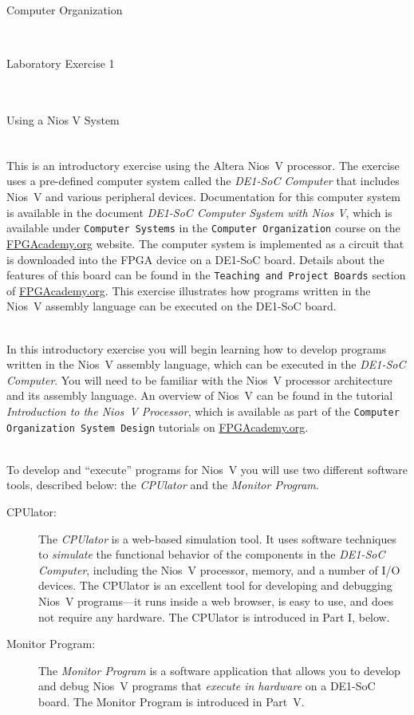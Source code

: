 \documentclass[epsfig,10pt,fullpage]{article}
\newcommand{\LabNum}{1}
\begin{document}
\centerline{\huge Computer Organization}
~\\
\centerline{\huge Laboratory Exercise \LabNum}
~\\
\centerline{\large Using a Nios\textsuperscript{\textregistered} V System}
~\\

\noindent
This is an introductory exercise using the Altera\textsuperscript{\textregistered} 
Nios\textsuperscript{\textregistered}~V processor.  The exercise uses 
a pre-defined computer system called the {\it DE1-SoC Computer} that includes Nios~V 
and various peripheral devices. Documentation for this computer system is available in the
document {\it DE1-SoC Computer System with Nios V}, which is available under 
\texttt{Computer Systems} in the \texttt{Computer Organization} course on the
{\small \href{https://www.fpgacademy.org/courses.html} {FPGAcademy.org}} website.
The computer system is implemented as a circuit that is downloaded into the FPGA device on
a DE1-SoC board. Details about the features of this board can be found in the
\texttt{Teaching and Project Boards} section of 
{\small \href{https://www.fpgacademy.org/boards.html} {FPGAcademy.org}}.
This exercise illustrates how programs written in the Nios~V assembly language 
can be executed on the DE1-SoC board. 

~\\
\noindent
In this introductory exercise you will begin learning how to develop programs written 
in the Nios~V assembly language, which can be executed in the {\it DE1-SoC Computer}. 
You will need to be familiar with the Nios~V processor architecture and its 
assembly language. An overview of Nios~V can be found in the tutorial 
{\it Introduction to the Nios~V Processor}, which is available as part of the 
\texttt{Computer Organization System Design} tutorials on
{\small \href{https://www.fpgacademy.org/tutorials.html} {FPGAcademy.org}}.

~\\
\noindent
To develop and ``execute'' programs for Nios~V you will use two different
software tools, described below: the {\it CPUlator} and the {\it Monitor Program}.

\begin{description}
   \item[CPUlator:] The {\it CPUlator} is a web-based simulation tool. It uses software 
   techniques to {\it simulate} the functional behavior of the components in the 
   {\it DE1-SoC Computer}, including the Nios~V processor, memory, and a number of I/O devices.
   The CPUlator is an excellent tool for developing and debugging Nios~V
   programs---it runs inside a web browser, is easy to use, and does not require any
   hardware.
   The CPUlator is introduced in Part I, below. 
   \item[Monitor Program:] The {\it Monitor Program} is a software application that
   allows you to develop and debug Nios~V programs that {\it execute in hardware} on a 
   DE1-SoC board.  The Monitor Program is introduced in Part~V.
\end{description}
\end{document}
